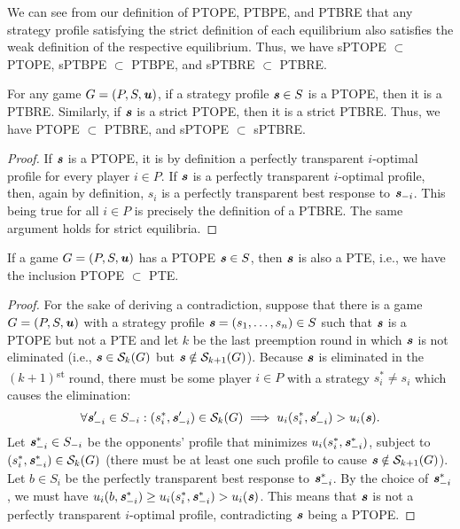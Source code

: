 \begin{observation}
	\label{th:strict-sub-weak}
	We can see from our definition of PTOPE, PTBPE, and PTBRE that any strategy profile satisfying the strict definition of each equilibrium also satisfies the weak definition of the respective equilibrium.
	Thus, we have sPTOPE $\subset$ PTOPE, sPTBPE $\subset$ PTBPE, and sPTBRE $\subset$ PTBRE.
\end{observation}

\begin{observation}
	\label{th:ptope-subset-ptbre}
	For any game $G = (P, S, \boldsymbol{\mathit{u}})$, if a strategy profile $\boldsymbol{\mathit{s}} \in S$ is a PTOPE, then it is a PTBRE.
	Similarly, if $\boldsymbol{\mathit{s}}$ is a strict PTOPE, then it is a strict PTBRE.
	Thus, we have PTOPE $\subset$ PTBRE, and sPTOPE $\subset$ sPTBRE.
\end{observation}

\begin{proof}
	If $\boldsymbol{\mathit{s}}$ is a PTOPE, it is by definition a perfectly transparent $i$-optimal profile for every player $i \in P$.
	If $\boldsymbol{\mathit{s}}$ is a perfectly transparent $i$-optimal profile, then, again by definition, $s_i$ is a perfectly transparent best response to $\boldsymbol{\mathit{s}}_{-i}$.
	This being true for all $i \in P$ is precisely the definition of a PTBRE.
	The same argument holds for strict equilibria.
\end{proof}

\begin{lemma}
	\label{th:ptope-subset-pte}
	If a game $G = (P, S, \boldsymbol{\mathit{u}})$ has a PTOPE $\boldsymbol{\mathit{s}} \in S$, then $\boldsymbol{\mathit{s}}$ is also a PTE, i.e., we have the inclusion PTOPE $\subset$ PTE.
\end{lemma}

\begin{proof}
	For the sake of deriving a contradiction, suppose that there is a game $G = (P, S, \boldsymbol{\mathit{u}})$ with a strategy profile $\boldsymbol{\mathit{s}} = (s_1, \dots, s_n) \in S$ such that $\boldsymbol{\mathit{s}}$ is a PTOPE but not a PTE and let $k$ be the last preemption round in which $\boldsymbol{\mathit{s}}$ is not eliminated (i.e., $\boldsymbol{\mathit{s}} \in \mathcal{S}_k(G)$ but $\boldsymbol{\mathit{s}} \notin \mathcal{S}_{k+1}(G)$).
	Because $\boldsymbol{\mathit{s}}$ is eliminated in the $(k+1)$\textsuperscript{st} round, there must be some player $i \in P$ with a strategy $s_i^* \ne s_i$ which causes the elimination:
	\[
		\forall \boldsymbol{\mathit{s}}_{-i}' \in S_{-i}: (s_i^*, \boldsymbol{\mathit{s}}_{-i}') \in \mathcal{S}_k(G) \implies u_i(s_i^*, \boldsymbol{\mathit{s}}_{-i}') > u_i(\boldsymbol{\mathit{s}}).
	\]
	Let $\boldsymbol{\mathit{s}}_{-i}^* \in S_{-i}$ be the opponents' profile that minimizes $u_i(s_i^*, \boldsymbol{\mathit{s}}_{-i}^*)$, subject to $(s_i^*, \boldsymbol{\mathit{s}}_{-i}^*)\in \mathcal{S}_k(G)$ (there must be at least one such profile to cause $\boldsymbol{\mathit{s}} \notin \mathcal{S}_{k+1}(G)$).
	Let $b \in S_i$ be the perfectly transparent best response to $\boldsymbol{\mathit{s}}_{-i}^*$.
	By the choice of $\boldsymbol{\mathit{s}}_{-i}^*$, we must have $u_i(b, \boldsymbol{\mathit{s}}_{-i}^*) \ge u_i(s_i^*, \boldsymbol{\mathit{s}}_{-i}^*) > u_i(\boldsymbol{\mathit{s}})$.
	This means that $\boldsymbol{\mathit{s}}$ is not a perfectly transparent $i$-optimal profile, contradicting $\boldsymbol{\mathit{s}}$ being a PTOPE.
\end{proof}


